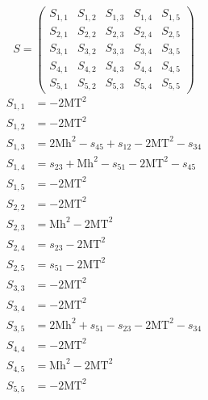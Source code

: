 \documentclass[a4paper]{article}
\begin{document}
\begin{equation}
S=\left(\begin{array}{ccccc}
   S_{1,1}&
   S_{1,2}&
   S_{1,3}&
   S_{1,4}&
   S_{1,5}\\
   S_{2,1}&
   S_{2,2}&
   S_{2,3}&
   S_{2,4}&
   S_{2,5}\\
   S_{3,1}&
   S_{3,2}&
   S_{3,3}&
   S_{3,4}&
   S_{3,5}\\
   S_{4,1}&
   S_{4,2}&
   S_{4,3}&
   S_{4,4}&
   S_{4,5}\\
   S_{5,1}&
   S_{5,2}&
   S_{5,3}&
   S_{5,4}&
   S_{5,5}\end{array}\right)
\end{equation}
\begin{subequations}
\begin{align}
   S_{1,1}&=-2\text{MT}^2\\
   S_{1,2}&=-2\text{MT}^2\\
   S_{1,3}&=2\text{Mh}^2-s_{45}+s_{12}-2\text{MT}^2-s_{34}\\
   S_{1,4}&=s_{23}+\text{Mh}^2-s_{51}-2\text{MT}^2-s_{45}\\
   S_{1,5}&=-2\text{MT}^2\\
   S_{2,2}&=-2\text{MT}^2\\
   S_{2,3}&=\text{Mh}^2-2\text{MT}^2\\
   S_{2,4}&=s_{23}-2\text{MT}^2\\
   S_{2,5}&=s_{51}-2\text{MT}^2\\
   S_{3,3}&=-2\text{MT}^2\\
   S_{3,4}&=-2\text{MT}^2\\
   S_{3,5}&=2\text{Mh}^2+s_{51}-s_{23}-2\text{MT}^2-s_{34}\\
   S_{4,4}&=-2\text{MT}^2\\
   S_{4,5}&=\text{Mh}^2-2\text{MT}^2\\
   S_{5,5}&=-2\text{MT}^2
\end{align}
\end{subequations}
\end{document}
